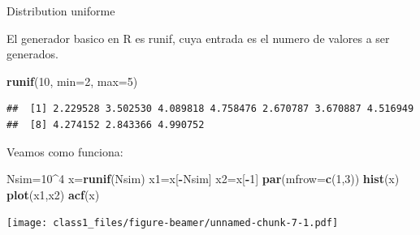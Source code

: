 \documentclass[ignorenonframetext,]{beamer}
\newenvironment{Shaded}{\begin{snugshade}}{\end{snugshade}}
\newcommand{\KeywordTok}[1]{\textcolor[rgb]{0.13,0.29,0.53}{\textbf{#1}}}
\newcommand{\DataTypeTok}[1]{\textcolor[rgb]{0.13,0.29,0.53}{#1}}
\newcommand{\DecValTok}[1]{\textcolor[rgb]{0.00,0.00,0.81}{#1}}
\newcommand{\OperatorTok}[1]{\textcolor[rgb]{0.81,0.36,0.00}{\textbf{#1}}}
\newcommand{\NormalTok}[1]{#1}
\begin{document}
\begin{frame}[fragile]

\begin{block}{Distribution uniforme}

El generador basico en R es runif, cuya entrada es el numero de valores
a ser generados.

\begin{Shaded}
\begin{Highlighting}[]
\KeywordTok{runif}\NormalTok{(}\DecValTok{10}\NormalTok{, }\DataTypeTok{min=}\DecValTok{2}\NormalTok{, }\DataTypeTok{max=}\DecValTok{5}\NormalTok{)}
\end{Highlighting}
\end{Shaded}

\begin{verbatim}
##  [1] 2.229528 3.502530 4.089818 4.758476 2.670787 3.670887 4.516949
##  [8] 4.274152 2.843366 4.990752
\end{verbatim}

Veamos como funciona:

\begin{Shaded}
\begin{Highlighting}[]
\NormalTok{Nsim=}\DecValTok{10}\OperatorTok{^}\DecValTok{4}
\NormalTok{x=}\KeywordTok{runif}\NormalTok{(Nsim)}
\NormalTok{x1=x[}\OperatorTok{-}\NormalTok{Nsim]}
\NormalTok{x2=x[}\OperatorTok{-}\DecValTok{1}\NormalTok{]}
\KeywordTok{par}\NormalTok{(}\DataTypeTok{mfrow=}\KeywordTok{c}\NormalTok{(}\DecValTok{1}\NormalTok{,}\DecValTok{3}\NormalTok{))}
\KeywordTok{hist}\NormalTok{(x)}
\KeywordTok{plot}\NormalTok{(x1,x2)}
\KeywordTok{acf}\NormalTok{(x)}
\end{Highlighting}
\end{Shaded}

\texttt{[image: class1\_files/figure-beamer/unnamed-chunk-7-1.pdf]}

\end{block}

\end{frame}
\end{document}
